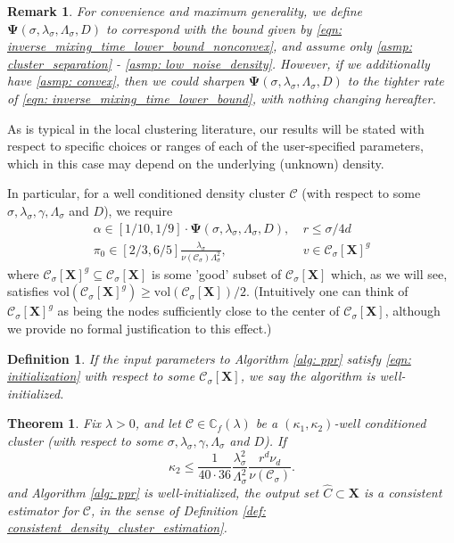 \documentclass{article}
\newcommand{\vol}{\mathrm{vol}}
\newcommand{\1}{\mathbf{1}}
\newcommand{\Xbf}{\mathbf{X}}
\newcommand{\Cbb}{\mathbb{C}}
\newcommand{\Cset}{\mathcal{C}}
\newcommand{\Csig}{\Cset_{\sigma}}
\theoremstyle{aldenthm}
\newtheorem{theorem}{Theorem}
\newtheorem{definition}{Definition}
\theoremstyle{aldenrmrk}
\newtheorem{remark}{Remark}
\begin{document}
\begin{remark}
	For convenience and maximum generality, we define $\mathbf{\Psi}(\sigma, \lambda_{\sigma}, \Lambda_{\sigma}, D)$ to correspond with the bound given by \eqref{eqn: inverse_mixing_time_lower_bound_nonconvex}, and assume only \ref{asmp: cluster_separation} - \ref{asmp: low_noise_density}. However, if we additionally have \ref{asmp: convex}, then we could sharpen $\mathbf{\Psi}(\sigma, \lambda_{\sigma}, \Lambda_{\sigma}, D)$ to the tighter rate of \eqref{eqn: inverse_mixing_time_lower_bound}, with nothing changing hereafter. 
\end{remark}

As is typical in the local clustering literature, our results will be stated with respect to specific choices or ranges of each of the user-specified parameters, which in this case may depend on the underlying (unknown) density. 

In particular, for a well conditioned density cluster $\Cset$ (with respect to some $\sigma, \lambda_{\sigma}, \gamma, \Lambda_{\sigma}$ and $D$), we require
\begin{align}
\label{eqn: initialization}
\alpha \in [1/10, 1/9] \cdot \mathbf{\Psi}(\sigma, \lambda_{\sigma}, \Lambda_{\sigma}, D), & ~r \leq \sigma/4d  \nonumber \\
\pi_0 \in [2/3, 6/5] \frac{\lambda_{\sigma}}{\nu(\Csig) \Lambda_{\sigma}^2}, & ~v \in \Csig[\Xbf]^g
\end{align}
where $\Csig[\Xbf]^g \subseteq \Csig[\Xbf]$ is some 'good' subset of $\Csig[\Xbf]$ which, as we will see, satisfies $\vol(\Csig[\Xbf]^g) \geq \vol(\Csig[\Xbf])/2$. (Intuitively one can think of $\Csig[\Xbf]^g$ as being the nodes sufficiently close to the center of $\Csig[\Xbf]$, although we provide no formal justification to this effect.)

\begin{definition}
	If the input parameters to Algorithm \ref{alg: ppr} satisfy \ref{eqn: initialization} with respect to some $\Csig[\Xbf]$, we say the algorithm is  \emph{well-initialized}.
\end{definition}

\begin{theorem}
	\label{thm: consistent_recovery_of_density_clusters}
	Fix $\lambda > 0$, and let $\Cset \in \Cbb_f(\lambda)$ be a $(\kappa_1,\kappa_2)$-well conditioned cluster (with respect to some $\sigma, \lambda_{\sigma}, \gamma, \Lambda_{\sigma}$ and $D$). If
	\begin{equation}
	\label{eqn: kappa2_ub}
	\kappa_2 \leq \frac{1}{40 \cdot 36} \frac{\lambda_{\sigma}^2}{\Lambda_{\sigma}^2} \frac{r^d \nu_d}{\nu(\Csig)}.
	\end{equation}
	and Algorithm \ref{alg: ppr} is well-initialized, the output set $\widehat{C} \subset \Xbf$ is a consistent estimator for $\Cset$, in the sense of Definition \ref{def: consistent_density_cluster_estimation}.
\end{theorem}
\end{document}

